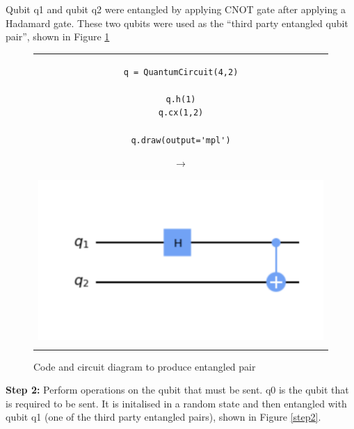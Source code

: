 Qubit q1 and qubit q2 were entangled by applying CNOT gate after applying a Hadamard gate. These two qubits were used as the ``third party entangled qubit pair'', shown in Figure \ref{step1}
\begin{figure}[H]
\centering
\begin{tabular}{c}
\begin{minipage}[c]{.45\linewidth}
\begin{verbatim}
q = QuantumCircuit(4,2)

q.h(1)
q.cx(1,2)

q.draw(output='mpl')
\end{verbatim}
\end{minipage}
\begin{minipage}[c]{.1\linewidth}
\centering
$\rightarrow$
\end{minipage}
\begin{minipage}[c]{.4\linewidth}
\centering
\includegraphics[width=\textwidth]{lab3/images/Step1.png}
\end{minipage}\\
\\ 
\end{tabular}
\caption{Code and circuit diagram to produce entangled pair}
\label{step1}
\end{figure}

\textbf{Step 2:} Perform operations on the qubit that must be sent.
q0 is the qubit that is required to be sent. It is initalised in a random state and then entangled with qubit q1 (one of the third party entangled pairs), shown in Figure \ref{step2}. 

